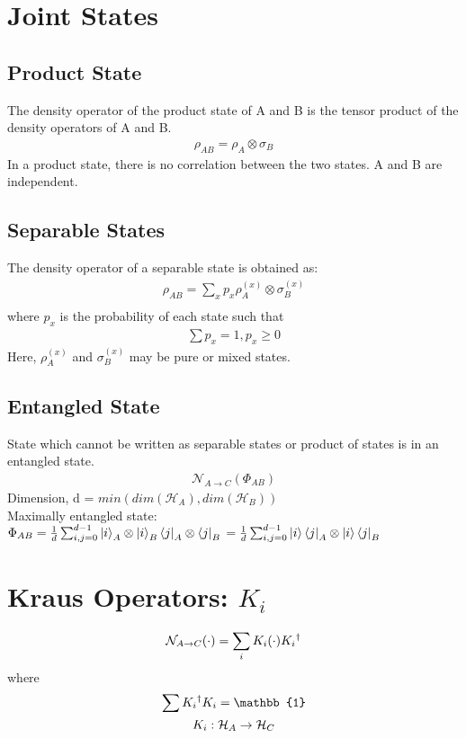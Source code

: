 \documentclass{article}
\begin{document}
\section{Joint States}
    \subsection{Product State}
     The density operator of the product state of A and B is the tensor product of the density operators of A and B.
    \begin{gather*}
     \rho _{AB} = \rho _{A} \otimes \sigma _{B}
    \end{gather*}
    In a product state, there is no correlation between the two states. A and B are independent.
    
    \subsection{Separable States}
    The density operator of a separable state is obtained as: 
    \begin{gather*}
            \rho _{AB} =  \sum_{x} p_{x} \rho ^{(x)} _{A} \otimes \sigma ^{(x)} _{B}  \\
    \end{gather*}
    where $p _{x}$ is the probability of each state such that
    \begin{gather*}
            \sum p_{x} = 1,   p_{x} \geq 0
    \end{gather*}
Here, $\rho ^{(x)} _{A} $ and $\sigma ^{(x)} _{B}$ may be pure or mixed states.

    \subsection{Entangled State}
    State which cannot be written as separable states or product of states is in an entangled state.
    \begin{gather*}
        \mathcal{N}_{A \rightarrow C}(\Phi _{AB})
    \end{gather*}
    Dimension, d = $min(dim(\mathcal{H}_{A}), dim(\mathcal{H}_{B}))$\\

    Maximally entangled state: $\Phi_{AB} = \frac{1}{d} \sum_{i,j=0}^{d-1}\ket{i}_{A} \otimes \ket{i}_{B} \bra{j}_{A} \otimes \bra{j}_{B}\\
    =\frac{1}{d} \sum_{i,j=0}^{d-1}\ket{i} \bra{j}_{A} \otimes \ket{i} \bra{j}_{B}
    $

    \section{Kraus Operators: $K_{i}$}
    \begin{gather*}
        \mathcal{N}_{A \rightarrow C} (\cdot) = \sum_{i} K_{i}(\cdot) K_{i}\textsuperscript{\textdagger}
    \end{gather*}
    where
    \begin{gather*}
        \sum K_{i}\textsuperscript{\textdagger} K_{i} =  \mathbb{1}\\
        K_{i} : \mathcal{H}_{A} \rightarrow{} \mathcal{H}_{C}
    \end{gather*}
\end{document}
